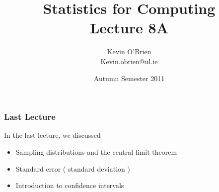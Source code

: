 \documentclass[a4]{beamer}
\title[MA4413]{Statistics for Computing \\ {\normalsize Lecture 8A}}
\author[Kevin O'Brien]{Kevin O'Brien \\ {\scriptsize Kevin.obrien@ul.ie}}
\date{Autumn Semester 2011}
\institute[Maths \& Stats]{Dept. of Mathematics \& Statistics, \\ University \textit{of} Limerick}
\begin{document}
\begin{frame}
\titlepage
\end{frame}



\begin{frame}
\frametitle{Last Lecture}
In the last lecture, we discussed
\begin{itemize}
\item Sampling distributions and the central limit theorem
\item Standard error ( standard deviation )
\item Introduction to confidence intervals
\end{itemize}

\end{frame}
\end{document}

